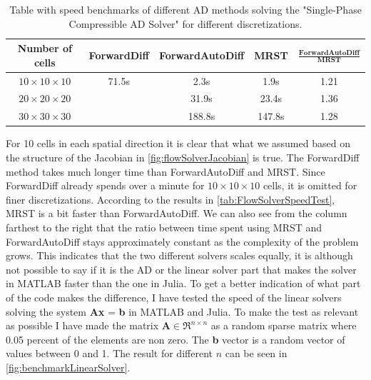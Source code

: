 \begin{table}[htb]
    \centering
    \caption{Table with speed benchmarks of different AD methods solving the "Single-Phase Compressible AD Solver" for different discretizations.}
    \label{tab:FlowSolverSpeedTest}
    \def\arraystretch{1.5}
    \begin{tabular}{ccccc}
    \textbf{Number of cells} & \textbf{ForwardDiff} & \textbf{ForwardAutoDiff} & \textbf{MRST} & $\frac{\textbf{ForwardAutoDiff}}{\textbf{MRST}}$\\
        \hline
         $10\times10\times10$ & 71.5s & 2.3s & 1.9s & 1.21 \\  
         $20\times20\times20$ & ~ & 31.9s & 23.4s & 1.36\\ 
         $30\times30\times30$ & ~ & 188.8s & 147.8s & 1.28\\ \hline
    \end{tabular}
\end{table}
For 10 cells in each spatial direction it is clear that what we assumed based on the structure of the Jacobian in \autoref{fig:flowSolverJacobian} is true. The ForwardDiff method takes much longer time than ForwardAutoDiff and MRST. Since ForwardDiff already spends over a minute for $10\times 10\times 10$ cells, it is omitted for finer discretizations. According to the results in \autoref{tab:FlowSolverSpeedTest}, MRST is a bit faster than ForwardAutoDiff. We can also see from the column farthest to the right that the ratio between time spent using MRST and ForwardAutoDiff stays approximately constant as the complexity of the problem grows. This indicates that the two different solvers scales equally, it is although not possible to say if it is the AD or the linear solver part that makes the solver in MATLAB faster than the one in Julia. To get a better indication of what part of the code makes the difference, I have tested the speed of the linear solvers solving the system \textbf{Ax} = \textbf{b} in MATLAB and Julia. To make the test as relevant as possible I have made the matrix \textbf{A}$\in\Re^{n\times n}$ as a random sparse matrix where 0.05 percent of the elements are non zero. The \textbf{b} vector is a random vector of values between 0 and 1. The result for different $n$ can be seen in \autoref{fig:benchmarkLinearSolver}. 
